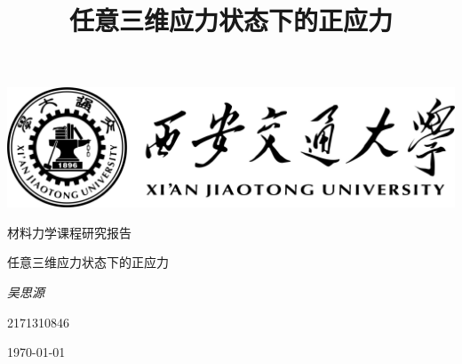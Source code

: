 \documentclass[12pt, a4paper]{ctexart}
\title{任意三维应力状态下的正应力}
\begin{document}
\begin{titlepage}
	\centering
	\includegraphics[width=1.0\textwidth]{./templates/logo.png}\par
	\vspace{2cm}
	{\kaishu\LARGE 材料力学课程研究报告\par}
	\vspace{1.5cm}
	{\fontsize{30pt}{\baselineskip}\heiti 任意三维应力状态下的正应力\par}
	\vspace{2cm}
	{\fangsong\Large\itshape 吴思源\par}
	\vfill
	{2171310846}\par

	\vfill
	{\large \today\par}
\end{titlepage}

\maketitle
\end{document}
